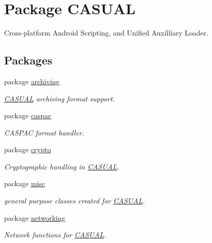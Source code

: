 \hypertarget{namespaceCASUAL}{\section{Package C\-A\-S\-U\-A\-L}
\label{namespaceCASUAL}
}


Cross-\/platform Android Scripting, and Unified Auxilliary Loader.  


\subsection*{Packages}
\begin{DoxyCompactItemize}
\item 
package \hyperlink{namespaceCASUAL_1_1archiving}{archiving}
\begin{DoxyCompactList}\small\item\em \hyperlink{namespaceCASUAL}{C\-A\-S\-U\-A\-L} archiving format support. \end{DoxyCompactList}\item 
package \hyperlink{namespaceCASUAL_1_1caspac}{caspac}
\begin{DoxyCompactList}\small\item\em C\-A\-S\-P\-A\-C format handler. \end{DoxyCompactList}\item 
package \hyperlink{namespaceCASUAL_1_1crypto}{crypto}
\begin{DoxyCompactList}\small\item\em Cryptographic handling in \hyperlink{namespaceCASUAL}{C\-A\-S\-U\-A\-L}. \end{DoxyCompactList}\item 
package \hyperlink{namespaceCASUAL_1_1misc}{misc}
\begin{DoxyCompactList}\small\item\em general purpose classes created for \hyperlink{namespaceCASUAL}{C\-A\-S\-U\-A\-L}. \end{DoxyCompactList}\item 
package \hyperlink{namespaceCASUAL_1_1networking}{networking}
\begin{DoxyCompactList}\small\item\em Network functions for \hyperlink{namespaceCASUAL}{C\-A\-S\-U\-A\-L}. \end{DoxyCompactList}\end{DoxyCompactItemize}
